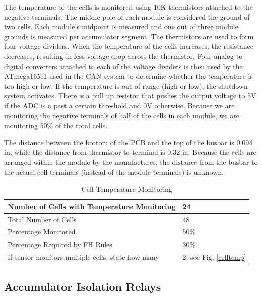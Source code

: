 \documentclass{article}
\begin{document}
     The temperature of the cells is monitored using 10K thermistors attached to the negative terminals. The middle pole of each module is considered the ground of two cells. Each module's midpoint is measured and one out of three module grounds is measured per accumulator segment. The thermistors are used to form four voltage dividers. When the temperature of the cells increases, the resistance decreases, resulting in less voltage drop across the thermistor. Four analog to digital converters attached to each of the voltage dividers is then used by the ATmega16M1 used in the CAN system to determine whether the temperature is too high or low. If the temperature is out of range (high or low), the shutdown system activates. There is a pull up resistor that pushes the output voltage to 5V if the ADC is a past a certain threshold and 0V otherwise. Because we are monitoring the negative terminals of half of the cells in each module, we are monitoring 50\% of the total cells.

     The distance between the bottom of the PCB and the top of the busbar is 0.094 in, while the distance from thermistor to terminal is 0.32 in. Because the cells are arranged within the module by the manufacturer, the distance from the busbar to the actual cell terminals (instead of the module terminals) is unknown.


        \begin{table}[H]
            \centering
            \begin{tabular}{|l|l|}
            \hline
            Number of Cells with Temperature Monitoring &  24\\ \hline
            Total Number of Cells & 48 \\ \hline
            Percentage Monitored & 50\% \\ \hline
            Percentage Required by FH Rules & 30\% \\ \hline
            If sensor monitors multiple cells, state how many & 2: see Fig. \ref{celltemp} \\ \hline
            \end{tabular}
            \caption{Cell Temperature Monitoring}
            \label{celltempmonitoring}
        \end{table}

\subsection{Accumulator Isolation Relays}
\end{document}
